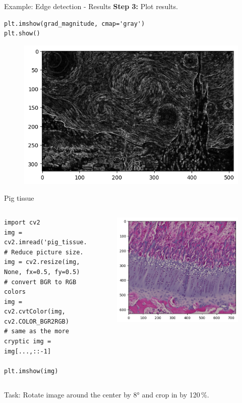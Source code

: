 \documentclass[compress%
,aspectratio=169%
]{beamer}
\begin{document}
\begin{frame}[fragile]{Example: Edge detection - Results}
\textbf{Step 3:} Plot results.
\begin{lstlisting}
plt.imshow(grad_magnitude, cmap='gray')
plt.show()
\end{lstlisting}
\begin{figure}
    \centering
    \includegraphics[width = 7 cm]{mpimgbeamertheme/img/grad_magnitude.png}
    \label{fig:enter-label}
\end{figure}
\end{frame}

\begin{frame}[fragile]{Pig tissue}
\begin{columns}

\begin{lstlisting}
import cv2
img = cv2.imread('pig_tissue.tif')
# Reduce picture size.
img = cv2.resize(img, None, fx=0.5, fy=0.5)
# convert BGR to RGB colors
img = cv2.cvtColor(img, cv2.COLOR_BGR2RGB)
# same as the more cryptic img = img[...,::-1]

plt.imshow(img)
\end{lstlisting}
    
\begin{figure}
    \centering
    \includegraphics[width = 1\linewidth]{mpimgbeamertheme/img/pig_python.png}
\end{figure}
\end{columns}
\alert{Task:} Rotate image around the center by 8° and crop in by 120\,\%.
\end{frame}
\end{document}
